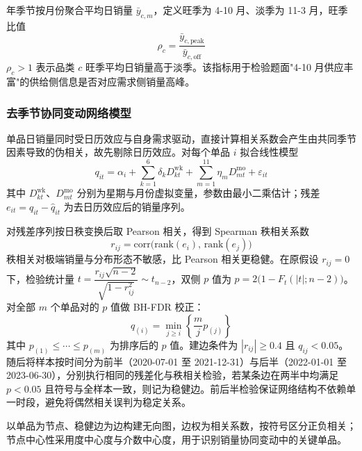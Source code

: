年季节按月份聚合平均日销量 $\bar y_{c,m}$，定义旺季为 4-10 月、淡季为 11-3 月，旺季比值
\begin{equation}\label{eq:rho}
  \rho_c=\frac{\bar y_{c,\mathrm{peak}}}{\bar y_{c,\mathrm{off}}}
\end{equation}
$\rho_c>1$ 表示品类 $c$ 旺季平均日销量高于淡季。该指标用于检验题面"4-10 月供应丰富"的供给侧信息是否对应需求侧销量高峰。

\subsubsection{去季节协同变动网络模型}

单品日销量同时受日历效应与自身需求驱动，直接计算相关系数会产生由共同季节因素导致的伪相关\cite{yule1926}，故先剔除日历效应。对每个单品 $i$ 拟合线性模型\cite{wooldridge2010}
\begin{equation}\label{eq:reg}
  q_{it}=\alpha_i+\sum_{k=1}^{6}\delta_k D^{\mathrm{wk}}_{kt}
  +\sum_{m=1}^{11}\eta_m D^{\mathrm{mo}}_{mt}+\varepsilon_{it}
\end{equation}
其中 $D^{\mathrm{wk}}_{kt}$、$D^{\mathrm{mo}}_{mt}$ 分别为星期与月份虚拟变量，参数由最小二乘估计；残差 $e_{it}=q_{it}-\hat q_{it}$ 为去日历效应后的销量序列。

对残差序列按日秩变换后取 Pearson 相关，得到 Spearman 秩相关系数\cite{spearman1904}
\begin{equation}\label{eq:spearman}
  r_{ij}=\mathrm{corr}\big(\mathrm{rank}(e_i),\,\mathrm{rank}(e_j)\big)
\end{equation}
秩相关对极端销量与分布形态不敏感，比 Pearson 相关更稳健。在原假设 $r_{ij}=0$ 下，检验统计量 $t=\dfrac{r_{ij}\sqrt{n-2}}{\sqrt{1-r_{ij}^2}}\sim t_{n-2}$，双侧 $p$ 值为 $p=2\big(1-F_t(|t|;n-2)\big)$。对全部 $m$ 个单品对的 $p$ 值做 BH-FDR 校正\cite{benjamini1995}：
\begin{equation}\label{eq:fdr}
  q_{(i)}=\min_{j\ge i}\left\{\frac{m}{j}p_{(j)}\right\}
\end{equation}
其中 $p_{(1)}\le\cdots\le p_{(m)}$ 为排序后的 $p$ 值。建边条件为 $|r_{ij}|\ge0.4$ 且 $q_{ij}<0.05$。随后将样本按时间分为前半（2020-07-01 至 2021-12-31）与后半（2022-01-01 至 2023-06-30），分别执行相同的残差化与秩相关检验，若某条边在两半中均满足 $p<0.05$ 且符号与全样本一致，则记为稳健边。前后半检验保证网络结构不依赖单一时段，避免将偶然相关误判为稳定关系。

以单品为节点、稳健边为边构建无向图\cite{tumminello2005,mantegna1999}，边权为相关系数，按符号区分正负相关；节点中心性采用度中心度与介数中心度\cite{freeman1977}，用于识别销量协同变动中的关键单品。

